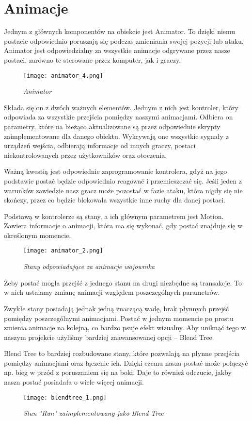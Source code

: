 \section{Animacje}
Jednym z głównych komponentów na obiekcie jest Animator.
To dzięki niemu postacie odpowiednio poruszają się podczas zmieniania swojej pozycji lub ataku.
Animator jest odpowiedzialny za wszystkie animacje odgrywane przez nasze postaci, zarówno te sterowane przez komputer, jak i graczy.

    \begin{figure}[H]
    \center
    \texttt{[image: animator\_4.png]}
    \caption{ \textit{Animator}}
    \end{figure}

Składa się on z dwóch ważnych elementów. Jednym z nich jest kontroler, który odpowiada za wszystkie przejścia pomiędzy naszymi animacjami. Odbiera on parametry, które na bieżąco aktualizowane są przez odpowiednie skrypty zaimplementowane dla danego obiektu. Wykrywają one wszystkie sygnały z urządzeń wejścia, odbierają informacje od innych graczy, postaci niekontrolowanych przez użytkowników oraz otoczenia.

Ważną kwestią jest odpowiednie zaprogramowanie kontrolera, gdyż na jego podstawie postać będzie odpowiednio reagować i przemieszczać się. Jeśli jeden z warunków zawiedzie nasz gracz może pozostać w fazie ataku, która nigdy się nie skończy, przez co będzie blokowała wszystkie inne ruchy dla danej postaci.

Podstawą w kontrolerze są stany, a ich głównym parametrem jest Motion. Zawiera informacje o animacji, która ma się wykonać, gdy postać znajduje się w określonym momencie.

\begin{figure}[H]
    \center
    \texttt{[image: animator\_2.png]}
    \caption{ \textit{Stany odpowiadające za animacje wojownika}}
    \end{figure}

Żeby postać mogła przejść z jednego stanu na drugi niezbędne są transakcje. To w nich ustalamy zmianę animacji względem poszczególnych parametrów. 

Zwykłe stany posiadają jednak jedną znaczącą wadę, brak płynnych przejść pomiędzy poszczególnymi animacjami. Postać w jednym momencie po prostu zmienia animacje na kolejną, co bardzo psuje efekt wizualny. Aby uniknąć tego w naszym projekcie użyliśmy bardziej zaawansowanej opcji – Blend Tree.

Blend Tree to bardziej rozbudowane stany, które pozwalają na płynne przejścia pomiędzy animacjami oraz łączenie ich. Dzięki czemu nasza postać może połączyć np. bieg w przód z poruszaniem się na boki. Daje to również odczucie, jakby nasza postać posiadała o wiele więcej animacji.
\begin{figure}[H]
    \center
    \texttt{[image: blendtree\_1.png]}
    \caption{ \textit{Stan "Run"  zaimplementowany jako Blend Tree}}
    \end{figure}


